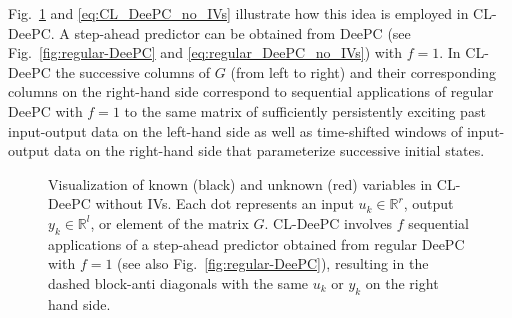 Fig.~\ref{fig:CL-DeePC} and \eqref{eq:CL_DeePC_no_IVs} illustrate how this idea is employed in \ac{CL-DeePC}. A step-ahead predictor can be obtained from \ac{DeePC} (see Fig.~\ref{fig:regular-DeePC} and \eqref{eq:regular_DeePC_no_IVs}) with $f=1$. In \ac{CL-DeePC} the successive columns of $G$ (from left to right) and their corresponding columns on the right-hand side correspond to sequential applications of regular \ac{DeePC} with $f=1$ to the same matrix of sufficiently persistently exciting past input-output data on the left-hand side as well as time-shifted windows of input-output data on the right-hand side that parameterize successive initial states.
%
%          
%          
\begin{figure}[b!]
\centering

\caption{Visualization of known (black) and unknown (red) variables in \ac{CL-DeePC} without \ac{IVs}. Each dot represents an input $u_k\in\mathbb{R}^r$, output $y_k\in\mathbb{R}^l$, or element of the matrix $G$. \ac{CL-DeePC} involves $f$ sequential applications of a step-ahead predictor obtained from regular \ac{DeePC} with $f=1$ (see also Fig.~\ref{fig:regular-DeePC}), resulting in the dashed block-anti diagonals with the same $u_k$ or $y_k$ on the right hand side.}
\label{fig:CL-DeePC}
\end{figure}
